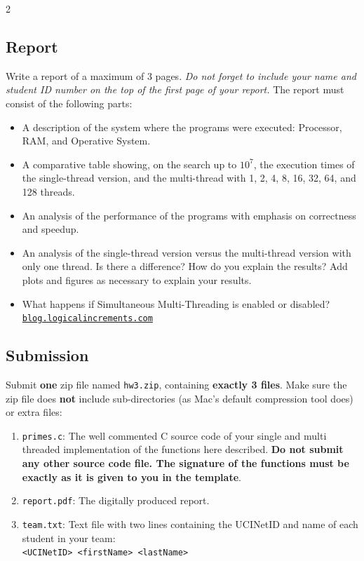 \documentclass[12pt]{article}
\begin{document}
\begin{multicols}{2}
\subsection*{Report}
Write a report of a maximum of 3 pages. {\em Do not forget to include your name and student ID number on the top of the first page of your report.} The report must consist of the following parts:
\begin{itemize}
  \item A description of the system where the programs were executed: Processor, RAM, and Operative System.
  \item A comparative table showing, on the search up to $10^7$, the execution times of the single-thread version, and the multi-thread with 1, 2, 4, 8, 16, 32, 64, and 128 threads.
  \item An analysis of the performance of the programs with emphasis on correctness and speedup.
  \item An analysis of the single-thread version versus the multi-thread version with only one thread. Is there a difference? How do you explain the results? Add plots and figures as necessary to explain your results.
\item What happens if Simultaneous Multi-Threading is enabled or disabled?
\href{http://blog.logicalincrements.com/2017/10/what-is-hyper-threading-simultaneous-multithreading/}{\tt {blog.logicalincrements.com}}

\end{itemize}


\subsection*{Submission}
Submit \textbf{one} zip file named \texttt{hw3.zip}, containing \textbf{exactly 3 files}. Make sure the zip file does \textbf{not} include sub-directories (as Mac's default compression tool does) or extra files:
\begin{enumerate}
\item \texttt{primes.c}: The well commented C source code of your single and multi threaded implementation of the functions here described. \textbf{Do not submit any other source code file. The signature of the functions must be exactly as it is given to you in the template}.
\item \texttt{report.pdf}: The digitally produced report.
\item \texttt{team.txt}: Text file with two lines containing the UCINetID and name of each student in your team:\\
  \texttt{<UCINetID> <firstName> <lastName>}
\end{enumerate}

\end{multicols}
\end{document}
